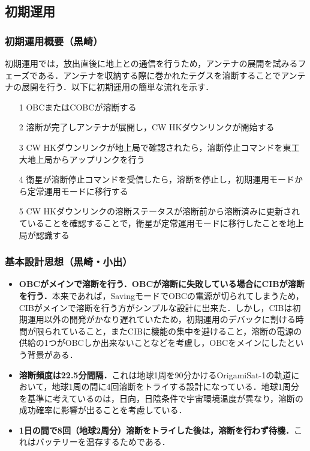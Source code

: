 
\subsection{初期運用}

\subsubsection{初期運用概要（黒崎）}
初期運用では，放出直後に地上との通信を行うため，アンテナの展開を試みるフェーズである．アンテナを収納する際に巻かれたテグスを溶断することでアンテナの展開を行う．以下に初期運用の簡単な流れを示す．

\begin{itemize}
	\item[1] OBCまたはCOBCが溶断する
	\item[2] 溶断が完了しアンテナが展開し，CW HKダウンリンクが開始する
	\item[3] CW HKダウンリンクが地上局で確認されたら，溶断停止コマンドを東工大地上局からアップリンクを行う
	\item[4] 衛星が溶断停止コマンドを受信したら，溶断を停止し，初期運用モードから定常運用モードに移行する
	\item[5] CW HKダウンリンクの溶断ステータスが溶断前から溶断済みに更新されていることを確認することで，衛星が定常運用モードに移行したことを地上局が認識する
\end{itemize}

\subsubsection{基本設計思想（黒崎・小出）}
\begin{itemize}
	\item \textbf{OBCがメインで溶断を行う．OBCが溶断に失敗している場合にCIBが溶断を行う．}本来であれば，SavingモードでOBCの電源が切られてしまうため，CIBがメインで溶断を行う方がシンプルな設計に出来た．しかし，CIBは初期運用以外の開発がかなり遅れていたため，初期運用のデバックに割ける時間が限られていること，またCIBに機能の集中を避けること，溶断の電源の供給の1つがOBCしか出来ないことなどを考慮し，OBCをメインにしたという背景がある．
	\item \textbf{溶断頻度は22.5分間隔．}これは地球1周を90分かけるOrigamiSat-1の軌道において，地球1周の間に4回溶断をトライする設計になっている．地球1周分を基準に考えているのは，日向，日陰条件で宇宙環境温度が異なり，溶断の成功確率に影響が出ることを考慮している．
	\item \textbf{1日の間で8回（地球2周分）溶断をトライした後は，溶断を行わず待機．}これはバッテリーを温存するためである．
\end{itemize}


